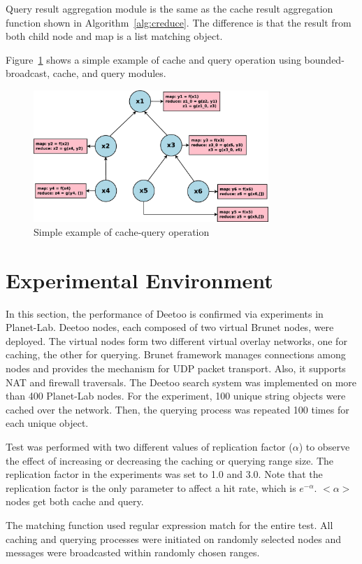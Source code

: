 \documentclass[9.5pt,journal,final,finalsubmission,twocolumn]{IEEEtran}
\begin{document}
Query result aggregation module is the same as the cache result aggregation function shown in Algorithm~\ref{alg:creduce}. 
The difference is that the result from both child node and map is a list matching object. 

Figure~\ref{fig:mapreduce_tree} shows a simple example of cache and query operation using bounded-broadcast, cache, and query modules.

\begin{figure}
\centering
\includegraphics[width=3.5in]{mapreduce_tree.eps}
\caption{Simple example of cache-query operation}\label{fig:mapreduce_tree}
\end{figure}

\fi

\section{Experimental Environment}
In this section, the performance of Deetoo is confirmed via experiments 
in Planet-Lab.
Deetoo nodes, each composed of two virtual Brunet nodes,
were deployed.
The virtual nodes form two 
different virtual overlay networks, one for caching, the other for 
querying.
Brunet framework manages connections among nodes and provides the mechanism 
for UDP packet transport. Also, it supports NAT and firewall traversals.
The Deetoo search system was implemented on more than 400 Planet-Lab nodes. 
For the experiment, 100 unique string objects were cached over 
the network. Then, 
the querying process was repeated 100 times for each unique object. 

Test was performed with two different values of replication factor 
($\alpha$) to observe the effect of increasing or decreasing the caching or 
querying range size. 
The replication factor in the experiments was set to 1.0 and 3.0.
Note that the replication factor is the only parameter to affect 
a hit rate, which is $e^{-\alpha}$. $<\alpha>$ nodes get both cache and 
query.

The matching function used regular expression match for the entire
test.
All caching and querying processes were initiated on randomly selected nodes
and messages were broadcasted within randomly chosen ranges. 
\end{document}

